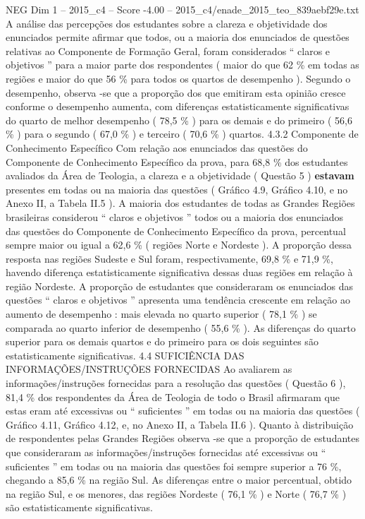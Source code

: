 \begin{textsample}{NEG Dim 1 – 2015\_c4 – Score -4.00 – 2015\_c4/enade\_2015\_teo\_839aebf29e.txt}
A análise das percepções dos estudantes sobre a clareza e objetividade dos enunciados permite afirmar que todos, ou a maioria dos enunciados de questões relativas ao Componente de Formação Geral, foram considerados “ claros e objetivos ” para a maior parte dos respondentes ( maior do que 62 \% em todas as regiões e maior do que 56 \% para todos os quartos de desempenho ).
Segundo o desempenho, observa -se que a proporção dos que emitiram esta opinião cresce conforme o desempenho aumenta, com diferenças estatisticamente significativas do quarto de melhor desempenho ( 78,5 \% ) para os demais e do primeiro ( 56,6 \% ) para o segundo ( 67,0 \% ) e terceiro ( 70,6 \% ) quartos. 4.3.2 Componente de Conhecimento Específico Com relação aos enunciados das questões do Componente de Conhecimento Específico da prova, para 68,8 \% dos estudantes avaliados da Área de Teologia, a clareza e a objetividade ( Questão 5 ) \textbf{estavam} presentes em todas ou na maioria das questões ( Gráfico 4.9, Gráfico 4.10, e no Anexo II, a Tabela II.5 ).
A maioria dos estudantes de todas as Grandes Regiões brasileiras considerou “ claros e objetivos ” todos ou a maioria dos enunciados das questões do Componente de Conhecimento Específico da prova, percentual sempre maior ou igual a 62,6 \% ( regiões Norte e Nordeste ).
A proporção dessa resposta nas regiões Sudeste e Sul foram, respectivamente, 69,8 \% e 71,9 \%, havendo diferença estatisticamente significativa dessas duas regiões em relação à região Nordeste.
A proporção de estudantes que consideraram os enunciados das questões “ claros e objetivos ” apresenta uma tendência crescente em relação ao aumento de desempenho : mais elevada no quarto superior ( 78,1 \% ) se comparada ao quarto inferior de desempenho ( 55,6 \% ).
As diferenças do quarto superior para os demais quartos e do primeiro para os dois seguintes são estatisticamente significativas. 4.4 SUFICIÊNCIA DAS INFORMAÇÕES/INSTRUÇÕES FORNECIDAS Ao avaliarem as informações/instruções fornecidas para a resolução das questões ( Questão 6 ), 81,4 \% dos respondentes da Área de Teologia de todo o Brasil afirmaram que estas eram até excessivas ou “ suficientes ” em todas ou na maioria das questões ( Gráfico 4.11, Gráfico 4.12, e, no Anexo II, a Tabela II.6 ).
Quanto à distribuição de respondentes pelas Grandes Regiões observa -se que a proporção de estudantes que consideraram as informações/instruções fornecidas até excessivas ou “ suficientes ” em todas ou na maioria das questões foi sempre superior a 76 \%, chegando a 85,6 \% na região Sul.
As diferenças entre o maior percentual, obtido na região Sul, e os menores, das regiões Nordeste ( 76,1 \% ) e Norte ( 76,7 \% ) são estatisticamente significativas.

\end{textsample}
